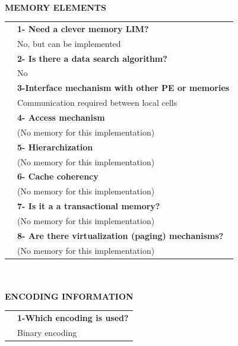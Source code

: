 \newpage{\large \textbf{\qquad }}\vspace{10pt}\\
{\large \textbf{MEMORY ELEMENTS}}\vspace{10pt}\\\begin{tabular}{ p{0.2cm} p{14.5cm}}
	&\textbf{1- Need a clever memory LIM?}\\
	&	No, but can be implemented\vspace{7pt}\\
	&\textbf{2- Is there a data search algorithm?}\\
	&	No\vspace{7pt}\\
	&\textbf{	3-Interface mechanism with other PE or memories}\\
	&	Communication required between local cells\vspace{7pt}\\
	&	\textbf{4- Access mechanism}\\
	&	(No memory for this implementation)\vspace{7pt}\\
	&	\textbf{5- Hierarchization} \\
	&	(No memory for this implementation)\vspace{7pt}\\
	&\textbf{	6- Cache coherency} \\
	&	(No memory for this implementation)\vspace{7pt}\\
	&\textbf{	7- Is it a a transactional memory?}\\
	&	(No memory for this implementation)\vspace{7pt}\\
	&\textbf{	8- Are there virtualization (paging) mechanisms?}\\
	&	(No memory for this implementation)\end{tabular}\vspace{14pt}\\
\vspace{10pt}\\
{\large\textbf{ENCODING INFORMATION}}\vspace{10pt}\\
\begin{tabular}{ p{0.2cm} p{14.5cm}}
	&\textbf{1-Which encoding is used?}\\
	&Binary encoding
\end{tabular}
\newpage{\large\textbf{ }}\vspace{10pt}\\
